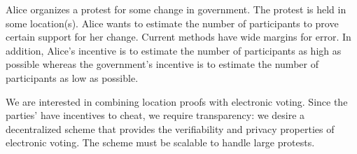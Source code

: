 Alice organizes a protest for some change in government.
The protest is held in some location(s).
Alice wants to estimate the number of participants to prove certain support for
her change.
Current methods have wide margins for error.
In addition, Alice's incentive is to estimate the number of participants as 
high as possible whereas the government's incentive is to estimate the number 
of participants as low as possible.

We are interested in combining location proofs with electronic voting.
Since the parties' have incentives to cheat, we require transparency: we desire 
a decentralized scheme that provides the verifiability and privacy properties 
of electronic voting.
The scheme must be scalable to handle large protests.

